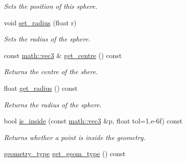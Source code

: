 \begin{DoxyCompactItemize}
\begin{DoxyCompactList}\small\item\em Sets the position of this sphere. \end{DoxyCompactList}\item 
\mbox{\label{classphysim_1_1geometry_1_1sphere_ac30153e443f883013539a8edfe317526}} 
void \hyperlink{classphysim_1_1geometry_1_1sphere_ac30153e443f883013539a8edfe317526}{set\+\_\+radius} (float r)
\begin{DoxyCompactList}\small\item\em Sets the radius of the sphere. \end{DoxyCompactList}\item 
\mbox{\label{classphysim_1_1geometry_1_1sphere_a748f7cb8d7f0678c881ee93657747685}} 
const \hyperlink{structphysim_1_1math_1_1vec3}{math\+::vec3} \& \hyperlink{classphysim_1_1geometry_1_1sphere_a748f7cb8d7f0678c881ee93657747685}{get\+\_\+centre} () const
\begin{DoxyCompactList}\small\item\em Returns the centre of the shere. \end{DoxyCompactList}\item 
\mbox{\label{classphysim_1_1geometry_1_1sphere_a54c406b28daa172c2504334eca114b5c}} 
float \hyperlink{classphysim_1_1geometry_1_1sphere_a54c406b28daa172c2504334eca114b5c}{get\+\_\+radius} () const
\begin{DoxyCompactList}\small\item\em Returns the radius of the sphere. \end{DoxyCompactList}\item 
bool \hyperlink{classphysim_1_1geometry_1_1sphere_a2858bd8fa9a68d660cec947917e6720c}{is\+\_\+inside} (const \hyperlink{structphysim_1_1math_1_1vec3}{math\+::vec3} \&p, float tol=1.e-\/6f) const
\begin{DoxyCompactList}\small\item\em Returns whether a point is inside the geometry. \end{DoxyCompactList}\item 
\mbox{\label{classphysim_1_1geometry_1_1sphere_a4294fa7f90c42bbb8e5bc69ac558b811}} 
\hyperlink{namespacephysim_1_1geometry_a60e1ee7ea6f443f8ec9341ca7f12f1b7}{geometry\+\_\+type} \hyperlink{classphysim_1_1geometry_1_1sphere_a4294fa7f90c42bbb8e5bc69ac558b811}{get\+\_\+geom\+\_\+type} () const

\end{DoxyCompactItemize}

